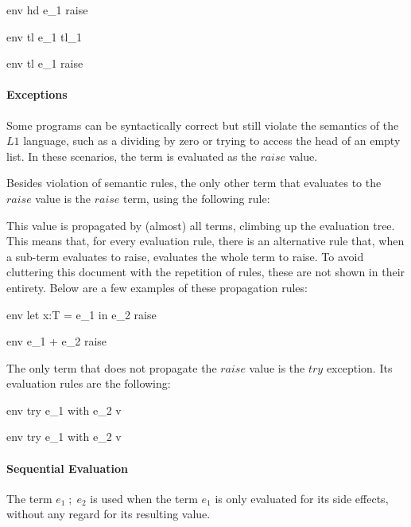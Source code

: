 \documentclass{article}
\begin{document}
	{\mbox{env} \vdash hd \; e_1 \Downarrow raise}
		
	{\mbox{env} \vdash tl \; e_1 \Downarrow tl_1}

	{\mbox{env} \vdash tl \; e_1 \Downarrow raise}
	
\paragraph{Exceptions}

Some programs can be syntactically correct but still violate the semantics of the $L1$ language, such as a dividing by zero or trying to access the head of an empty list.
In these scenarios, the term is evaluated as the $raise$ value. 

Besides violation of semantic rules, the only other term that evaluates to the $raise$ value is the $raise$ term, using the following rule:


This value is propagated by (almost) all terms, climbing up the evaluation tree.
This means that, for every evaluation rule, there is an alternative rule that, when a sub-term evaluates to raise, evaluates the whole term to raise.
To avoid cluttering this document with the repetition of rules, these are not shown in their entirety. 
Below are a few examples of these propagation rules:

	{\mbox{env} \vdash let \; x:T = e_1 \; in \; e_2 \Downarrow raise}

	{\mbox{env} \vdash e_1 + e_2 \Downarrow raise}

The only term that does not propagate the $raise$ value is the $try$ exception.
Its evaluation rules are the following:

	{\mbox{env} \vdash try \; e_1 \; with \; e_2 \Downarrow v}
	
	{\mbox{env} \vdash try \; e_1 \; with \; e_2 \Downarrow v}

\paragraph{Sequential Evaluation}
The term $e_1 \; ; \; e_2$ is used when the term $e_1$ is only evaluated for its side effects, without any regard for its resulting value.
\end{document}
